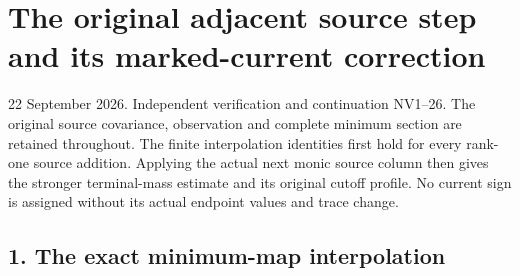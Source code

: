\documentclass[11pt]{article}
\begin{document}
\clearpage
\section{The original adjacent source step and its marked-current correction}\label{part5-the-original-adjacent-source-step-and-its-marked-current-correction}

22 September 2026. Independent verification and continuation NV1--26. The original source covariance, observation and complete minimum section are retained throughout. The finite interpolation identities first hold for every rank-one source addition. Applying the actual next monic source column then gives the stronger terminal-mass estimate and its original cutoff profile. No current sign is assigned without its actual endpoint values and trace change.

\subsection{1. The exact minimum-map interpolation}\label{part5-the-exact-minimum-map-interpolation}
\end{document}

